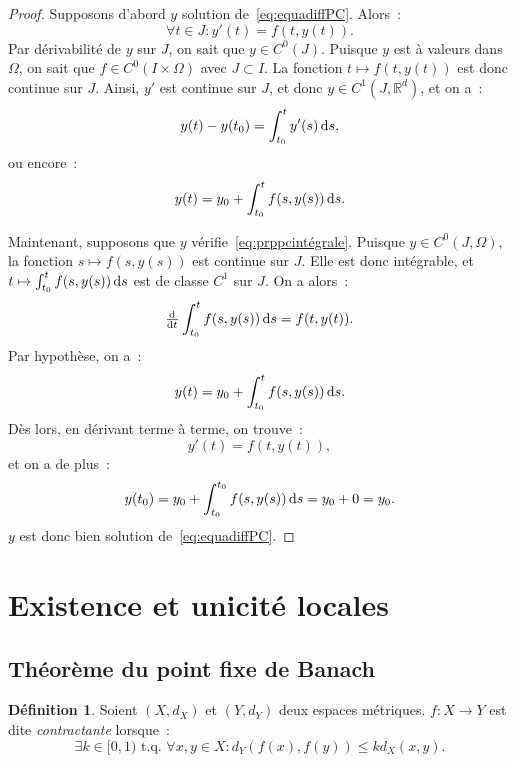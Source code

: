\documentclass{report}
\theoremstyle{definition}
\newtheorem{déf}[thm]{Définition}
\theoremstyle{remark}
\numberwithin{equation}{section}
\newcommand{\R}{\mathbb R}
\newcommand{\tq}{\text{ t.q. }}
\begin{document}
			\begin{proof} Supposons d'abord $y$ solution de~\eqref{eq:equadiffPC}. Alors~:
			\begin{equation}
				\forall t \in J : y'(t) = f(t, y(t)).
			\end{equation}
			Par dérivabilité de $y$ sur $J$, on sait que $y \in C^0(J)$. Puisque $y$ est à valeurs dans $\Omega$, on sait que $f \in C^0(I \times \Omega)$ avec
			$J \subset I$. La fonction $t \mapsto f(t, y(t))$ est donc continue sur $J$. Ainsi, $y'$ est continue sur $J$, et donc $y \in C^1(J, \R^d)$, et on a~:
			\begin{equation}
				y(t) - y(t_0) = \int_{t_0}^ty'(s)\dif s,
			\end{equation}
			ou encore~:
			\begin{equation}
				y(t) = y_0 + \int_{t_0}^t f(s, y(s))\dif s.
			\end{equation}

			Maintenant, supposons que $y$ vérifie~\eqref{eq:prppcintégrale}. Puisque $y \in C^0(J, \Omega)$, la fonction $s \mapsto f(s, y(s))$ est continue
			sur $J$. Elle est donc intégrable, et $t \mapsto \int_{t_0}^t f(s, y(s))\dif s$ est de classe $C^1$ sur $J$. On a alors~:
			\begin{equation}
				\od {}t\int_{t_0}^tf(s, y(s))\dif s = f(t, y(t)).
			\end{equation}
			Par hypothèse, on a~:
			\begin{equation}
				y(t) = y_0 + \int_{t_0}^tf(s, y(s))\dif s.
			\end{equation}
			Dès lors, en dérivant terme à terme, on trouve~:
			\begin{equation}
				y'(t) = f(t, y(t)),
			\end{equation}
			et on a de plus~:
			\begin{equation}
				y(t_0) = y_0 + \int_{t_0}^{t_0}f(s, y(s))\dif s = y_0 + 0 = y_0.
			\end{equation}
			$y$ est donc bien solution de~\eqref{eq:equadiffPC}.
			\end{proof}

	\section{Existence et unicité locales}
		\subsection{Théorème du point fixe de Banach}
			\begin{déf} Soient $(X, d_X)$ et $(Y, d_Y)$ deux espaces métriques. $f : X \to Y$ est dite \textit{contractante} lorsque~:
			\begin{equation}
				\exists k \in [0, 1) \tq \forall x, y \in X : d_Y(f(x), f(y)) \leq kd_X(x, y).
			\end{equation}
			\end{déf}
\end{document}
